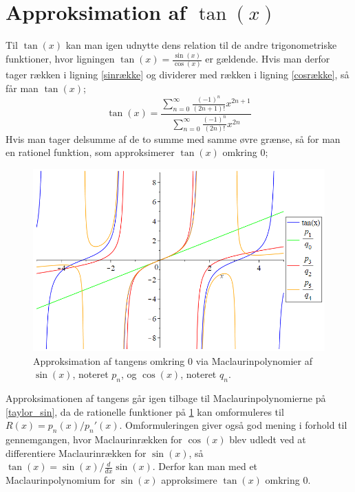 \section{Approksimation af $\tan(x)$}
Til $\tan(x)$ kan man igen udnytte dens relation til de andre trigonometriske funktioner, hvor ligningen $\tan(x)=\frac{\sin(x)}{\cos(x)}$ er gældende. Hvis man derfor tager rækken i ligning \ref{sinrække} og dividerer med rækken i ligning \ref{cosrække}, så får man $\tan(x)$;
\begin{equation}\label{tanbrøk}
\tan(x)
=
\frac{\sum_{n=0}^{\infty} \frac{(-1)^n}{(2n+1)!}x^{2n+1}}
{\sum_{n=0}^{\infty} \frac{(-1)^n}{(2n)!}x^{2n}}
\end{equation}
Hvis man tager delsumme af de to summe med samme øvre grænse, så for man en rationel funktion, som approksimerer $\tan(x)$ omkring $0$;
\begin{figure}[H]
	\centering
	\includegraphics[scale=0.4]{fig/img/approks_tan}
	\caption{Approksimation af tangens omkring 0 via Maclaurinpolynomier af $\sin(x)$, noteret $p_n$, og $\cos(x)$, noteret $q_n$.}
 	\label{approks_tan}
\end{figure}
Approksimationen af tangens går igen tilbage til Maclaurinpolynomierne på \ref{taylor_sin}, da de rationelle funktioner på \ref{approks_tan} kan omformuleres til $R(x)=p_n(x)/p_n'(x)$. Omformuleringen giver også god mening i forhold til gennemgangen, hvor Maclaurinrækken for $\cos(x)$ blev udledt ved at differentiere Maclaurinrækken for $\sin(x)$, så $\tan(x)=\sin(x)/\frac{d}{dx}\sin(x)$. Derfor kan man med et Maclaurinpolynomium for $\sin(x)$ approksimere $\tan(x)$ omkring $0$.

